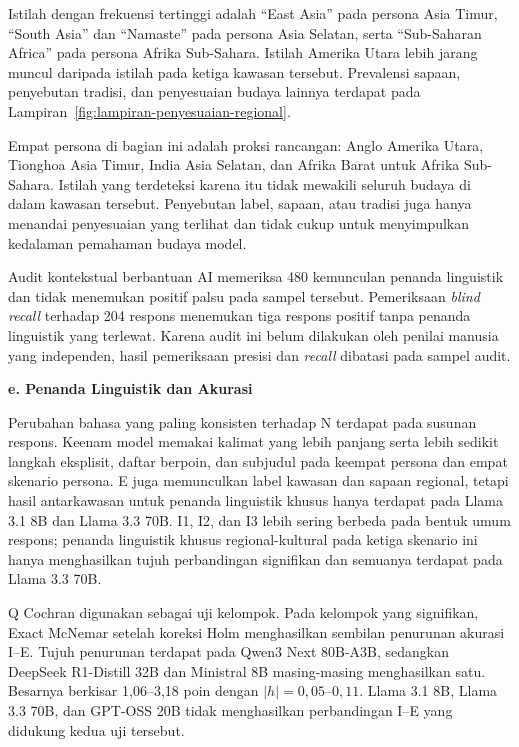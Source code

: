 Istilah dengan frekuensi tertinggi adalah ``East Asia'' pada persona
Asia Timur, ``South Asia'' dan ``Namaste'' pada persona Asia Selatan, serta
``Sub-Saharan Africa'' pada persona Afrika Sub-Sahara. Istilah Amerika Utara
lebih jarang muncul daripada istilah pada ketiga kawasan tersebut. Prevalensi
sapaan, penyebutan tradisi, dan penyesuaian budaya lainnya terdapat pada
Lampiran~\ref{fig:lampiran-penyesuaian-regional}.

Empat persona di bagian ini adalah proksi rancangan: Anglo Amerika Utara,
Tionghoa Asia Timur, India Asia Selatan, dan Afrika Barat untuk Afrika
Sub-Sahara. Istilah yang terdeteksi karena itu tidak mewakili seluruh budaya di
dalam kawasan tersebut. Penyebutan label, sapaan, atau tradisi juga hanya
menandai penyesuaian yang terlihat dan tidak cukup untuk menyimpulkan kedalaman
pemahaman budaya model.

Audit kontekstual berbantuan AI memeriksa 480 kemunculan penanda linguistik dan tidak
menemukan positif palsu pada sampel tersebut. Pemeriksaan \textit{blind recall}
terhadap 204 respons menemukan tiga respons positif tanpa penanda linguistik yang
terlewat. Karena audit ini belum dilakukan oleh penilai manusia yang independen,
hasil pemeriksaan presisi dan \textit{recall} dibatasi pada sampel audit.

\par\noindent\textbf{e. Penanda Linguistik dan Akurasi}\par

Perubahan bahasa yang paling konsisten terhadap N terdapat pada susunan
respons. Keenam model memakai kalimat yang lebih panjang serta lebih sedikit
langkah eksplisit, daftar berpoin, dan subjudul pada keempat persona dan empat
skenario persona. E juga memunculkan label kawasan dan sapaan regional, tetapi
hasil antarkawasan untuk penanda linguistik khusus hanya terdapat pada Llama 3.1 8B dan
Llama 3.3 70B. I1, I2, dan I3 lebih sering berbeda pada bentuk umum respons;
penanda linguistik khusus regional-kultural pada ketiga skenario ini hanya menghasilkan
tujuh perbandingan signifikan dan semuanya terdapat pada Llama 3.3 70B.

Q Cochran digunakan sebagai uji kelompok. Pada kelompok yang signifikan, Exact
McNemar setelah koreksi Holm menghasilkan sembilan penurunan akurasi I--E.
Tujuh penurunan terdapat pada Qwen3 Next 80B-A3B, sedangkan
DeepSeek R1-Distill 32B dan Ministral 8B masing-masing menghasilkan satu.
Besarnya berkisar 1,06--3,18 poin dengan $|h|=0{,}05$--$0{,}11$. Llama 3.1 8B,
Llama 3.3 70B, dan GPT-OSS 20B tidak menghasilkan perbandingan I--E yang
didukung kedua uji tersebut.


